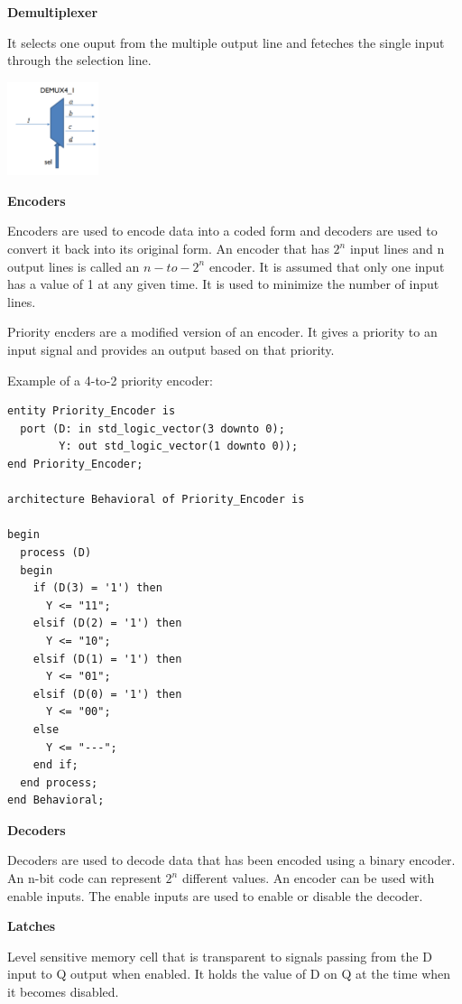 \textbf{Demultiplexer}

It selects one ouput from the multiple output line and feteches the single input through
the selection line.


\begin{center}
	\includegraphics[width=0.2\textwidth]{images/demux.png}
\end{center}


\textbf{Encoders}

Encoders are used to encode data into a coded form and decoders
are used to convert it back into its original form. An encoder that has
$2^n$ input lines and n output lines is called an $n-to-2^n$ encoder.
It is assumed that only one input has a value of 1 at any given time.
It is used to minimize the number of input lines.

Priority encders are a modified version of an encoder. It gives a priority
to an input signal and provides an output based on that priority.

Example of a 4-to-2 priority encoder:

\begin{verbatim}
entity Priority_Encoder is
  port (D: in std_logic_vector(3 downto 0);
        Y: out std_logic_vector(1 downto 0));
end Priority_Encoder;

architecture Behavioral of Priority_Encoder is

begin
  process (D)
  begin
    if (D(3) = '1') then
      Y <= "11";
    elsif (D(2) = '1') then
      Y <= "10";
    elsif (D(1) = '1') then
      Y <= "01";
    elsif (D(0) = '1') then
      Y <= "00";
    else
      Y <= "---";
    end if;
  end process;
end Behavioral;
\end{verbatim}

\textbf{Decoders}

Decoders are used to decode data that has been encoded using a binary encoder.
An n-bit code can represent $2^n$ different values.
An encoder can be used with enable inputs. The enable inputs are used to enable or disable the decoder.


\textbf{Latches}

Level sensitive memory cell that is transparent to signals passing from
the D input to Q output when enabled. It holds the value of D on Q at the
time when it becomes disabled.

